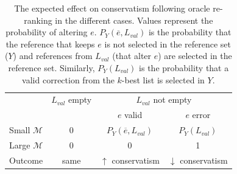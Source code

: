 \documentclass[letterpaper, 11pt]{article}
\begin{document}
\begin{table}[h]
	\vspace{-0.5cm}
	\centering
	\small
	\singlespacing
	\begin{tabular}{c|c|cc}
		 & $L_{val}$ empty & \multicolumn{2}{c}{$L_{val}$ not empty} \\
		&            & $e$ valid & $e$ error \\ \hline
		\multicolumn{1}{c|}{Small $\mathcal{M}$} & 0 & $P_Y(\overline{e}, L_{val})$ & $P_Y\left(L_{val}\right)$    \\
		\multicolumn{1}{c|}{Large $\mathcal{M}$} & 0 & 0              & 1                  \\ \hline
		\multicolumn{1}{c|}{Outcome}            & same  & $\uparrow$ conservatism        & $\downarrow$ conservatism
	\end{tabular}
	\caption{\label{ta:oracle_expected_results}
	The expected effect on conservatism following oracle re-ranking in the different cases.
	Values represent the probability of altering $e$. 
	$P_Y(\overline{e}, L_{val})$ is the probability that the reference that keeps $e$ is not selected in the reference set ($Y$) and references
	from $L_{val}$ (that alter $e$) are selected in the reference set. Similarly, $P_Y\left(L_{val}\right)$ is the probability that a valid correction from the
	$k$-best list is selected in $Y$. 
	}
	
	\vspace{-0.6cm}
\end{table}
%
\end{document}
